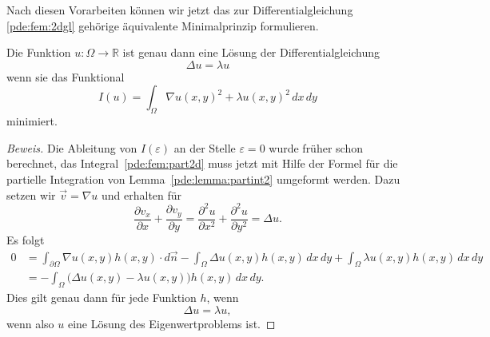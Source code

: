 Nach diesen Vorarbeiten können wir jetzt das zur Differentialgleichung
\eqref{pde:fem:2dgl} gehörige äquivalente Minimalprinzip formulieren.

\begin{satz}
Die Funktion $u\colon\Omega\to\mathbb R$ ist genau dann eine Lösung der
Differentialgleichung
\[
\Delta u =\lambda u
\]
wenn sie das Funktional
\[
I(u)
=
\int_{\Omega} \nabla u(x,y)^2 + \lambda u(x,y)^2 \,dx\,dy
\]
minimiert.
\end{satz}

\begin{proof}[Beweis]
Die Ableitung von $I(\varepsilon)$ an der Stelle $\varepsilon=0$
wurde früher schon berechnet, das Integral~\eqref{pde:fem:part2d}
muss jetzt mit Hilfe der Formel für die partielle Integration
von Lemma~\ref{pde:lemma:partint2} umgeformt werden.
Dazu setzen wir $\vec{v}=\nabla u$ und erhalten für
\[
\frac{\partial v_x}{\partial x}
+
\frac{\partial v_y}{\partial y}
=
\frac{\partial^2 u}{\partial x^2}
+
\frac{\partial^2 u}{\partial y^2}
=
\Delta u.
\]
Es folgt
\begin{align*}
0
&=
\int_{\partial\Omega} \nabla u(x,y) h(x,y) \cdot d\vec{n}
-
\int_{\Omega} \Delta u(x,y) h(x,y)\,dx\,dy
+
\int_{\Omega} \lambda u(x,y) h(x,y)\,dx\,dy
\\
&=
-
\int_{\Omega} \bigl(\Delta u(x,y)-\lambda u(x,y)\bigr) h(x,y)\,dx\,dy.
\end{align*}
Dies gilt genau dann für jede Funktion $h$, wenn
\[
\Delta u = \lambda u,
\]
wenn also $u$ eine Lösung des Eigenwertproblems ist.
\end{proof}






